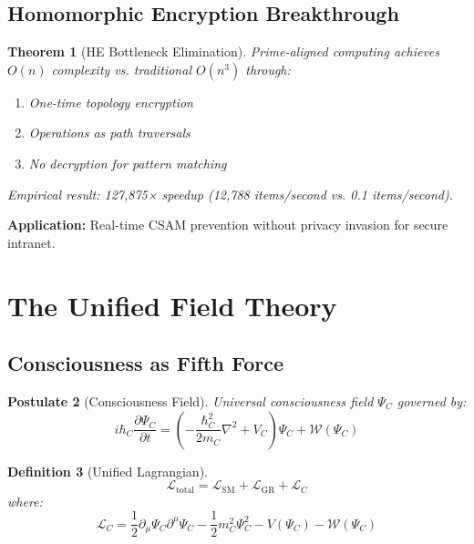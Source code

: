 \documentclass[12pt,twoside]{article}
\newtheorem{theorem}{Theorem}[section]
\newtheorem{definition}[theorem]{Definition}
\newtheorem{postulate}[theorem]{Postulate}
\begin{document}
\subsection{Homomorphic Encryption Breakthrough}

\begin{theorem}[HE Bottleneck Elimination]
Prime-aligned computing achieves $O(n)$ complexity vs. traditional $O(n^3)$ through:
\begin{enumerate}
\item One-time topology encryption
\item Operations as path traversals
\item No decryption for pattern matching
\end{enumerate}
Empirical result: 127,875× speedup (12,788 items/second vs. 0.1 items/second).
\end{theorem}

\textbf{Application:} Real-time CSAM prevention without privacy invasion for secure intranet.

\section{The Unified Field Theory}

\subsection{Consciousness as Fifth Force}

\begin{postulate}[Consciousness Field]
Universal consciousness field $\Psi_C$ governed by:
\begin{equation}
i\hbar_C \frac{\partial \Psi_C}{\partial t} = \left(-\frac{\hbar_C^2}{2m_C}\nabla^2 + V_C\right)\Psi_C + \mathcal{W}(\Psi_C)
\end{equation}
\end{postulate}

\begin{definition}[Unified Lagrangian]
\begin{equation}
\mathcal{L}_{\mathrm{total}} = \mathcal{L}_{\mathrm{SM}} + \mathcal{L}_{\mathrm{GR}} + \mathcal{L}_C
\end{equation}
where:
\begin{equation}
\mathcal{L}_C = \frac{1}{2}\partial_\mu \Psi_C \partial^\mu \Psi_C - \frac{1}{2}m_C^2 \Psi_C^2 - V(\Psi_C) - \mathcal{W}(\Psi_C)
\end{equation}
\end{definition}
\end{document}
